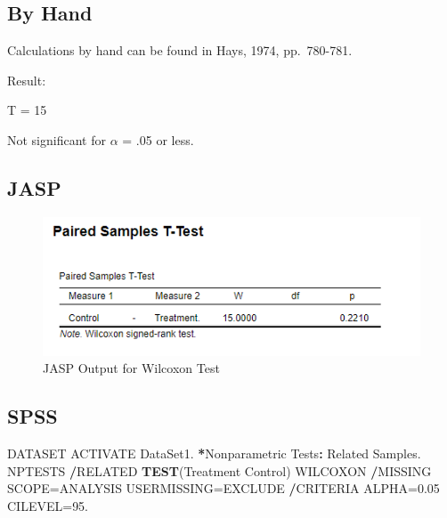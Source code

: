 \documentclass[
]{book}
\newenvironment{Shaded}{\begin{snugshade}}{\end{snugshade}}
\newcommand{\FloatTok}[1]{\textcolor[rgb]{0.00,0.00,0.81}{#1}}
\newcommand{\KeywordTok}[1]{\textcolor[rgb]{0.13,0.29,0.53}{\textbf{#1}}}
\newcommand{\NormalTok}[1]{#1}
\newcommand{\OperatorTok}[1]{\textcolor[rgb]{0.81,0.36,0.00}{\textbf{#1}}}
\newcommand{\StringTok}[1]{\textcolor[rgb]{0.31,0.60,0.02}{#1}}
\begin{document}
\hypertarget{by-hand-3}{%
\subsection{By Hand}\label{by-hand-3}}

Calculations by hand can be found in Hays, 1974, pp.~780-781.

Result:

T = 15

Not significant for \(\alpha\) = .05 or less.

\hypertarget{jasp-2}{%
\subsection{JASP}\label{jasp-2}}

\begin{figure}[!h]
\includegraphics{Screenshots/Wilcoxon Test/WilcoxonJASP} \caption{\label{fig:WilcoxonJASP}JASP Output for Wilcoxon Test}\label{fig:WilcoxonJASP}
\end{figure}

\hypertarget{spss-3}{%
\subsection{SPSS}\label{spss-3}}

\begin{Shaded}
\begin{Highlighting}[]
\NormalTok{DATASET ACTIVATE DataSet1.}
\OperatorTok{*}\NormalTok{Nonparametric Tests}\OperatorTok{:}\StringTok{ }\NormalTok{Related Samples. }
\NormalTok{NPTESTS }
  \OperatorTok{/}\NormalTok{RELATED }\KeywordTok{TEST}\NormalTok{(Treatment Control) WILCOXON }
  \OperatorTok{/}\NormalTok{MISSING SCOPE=ANALYSIS USERMISSING=EXCLUDE}
  \OperatorTok{/}\NormalTok{CRITERIA ALPHA=}\FloatTok{0.05}\NormalTok{  CILEVEL=}\FloatTok{95.}
\end{Highlighting}
\end{Shaded}
\end{document}
